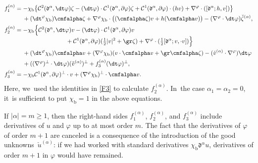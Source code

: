 \begin{align*}
f_1^{(\alpha)}
&= - \chi_\mathrm{b}\bigl\{ {\mathcal C}^2(\mathfrak{d}^\alpha,\dt \varphi)\zeta
- (\dt\varphi)\cdot {\mathcal C}^1(\mathfrak{d}^\alpha,\partial\varphi)\zeta
+ {\mathcal C}^1(\mathfrak{d}^\alpha,\partial\varphi)\cdot(hv)
+ \nabla^\varphi\cdot([\mathfrak{d}^\alpha;h,v]) \bigr\} \\
&\quad\;
+ (\dt^\varphi\chi_\mathrm{b}) \cmfalpha \zeta
+ \nabla^\varphi\chi_\mathrm{b}\cdot\bigl((\cmfalpha \zeta)v + h (\cmfalpha v) \bigr)
- (\nabla^\varphi\cdot\dt\varphi)\check{\zeta}^{(\alpha)}, \\
f_2^{(\alpha)}
&= -\chi_\mathrm{b}\Bigl\{ {\mathcal C}^2(\mathfrak{d}^\alpha,\dt \varphi) v
- (\dt\varphi)\cdot {\mathcal C}^1(\mathfrak{d}^\alpha,\partial\varphi)v\\[-3pt]
&\hspace*{3cm}+ {\mathcal C}^1(\mathfrak{d}^\alpha,\partial\varphi) (\tfrac12|v|^2+\gr\zeta)
+ \nabla^\varphi\cdot(\tfrac12[\mathfrak{d}^\alpha;v,\cdot v]) \Bigr\}\\
&\quad\;+ (\dt^\varphi\chi_\mathrm{b}) \cmfalpha v
+ (\nabla^\varphi\chi_\mathrm{b})(v\cdot\cmfalpha v + \gr\cmfalpha\zeta)- (\check{v}^{(\alpha)}\cdot\nabla^\varphi)\dt\varphi  \\
&\quad\;
+ ((\nabla^\varphi)^\perp\cdot\dt\varphi)(\check{v}^{(\alpha)})^\perp
+ f_3^{(\alpha)}(\dt\varphi)^\perp, \\
f_3^{(\alpha)}
&= -\chi_\mathrm{b} {\mathcal C}^1(\mathfrak{d}^\alpha,\partial\varphi)^\perp \cdot v
+ (\nabla^\varphi\chi_\mathrm{b})^\perp\cdot \cmfalpha v.
\end{align*}
Here, we~used the identities in \eqref{F3} to calculate $f_2^{(\alpha)}$. In~the case $\alpha_1=\alpha_2=0$, it~is sufficient to put $\chi_\mathrm{b}=1$ in the above equations.

\begin{remark}\label{re:GU1}
If $|\alpha|=m\geq1$, then the right-hand sides $f_1^{(\alpha)}$, $f_2^{(\alpha)}$, and $f_3^{(\alpha)}$ include derivatives of $u$ and $\varphi$
up to at most order $m$.
The fact that the derivatives of $\varphi$ of order $m+1$ are canceled is a consequence of the introduction of the good unknowns~$\check{u}^{(\alpha)}$:
if we had worked with standard derivatives $\chi_\mathrm{b}\mathfrak{d}^\alpha u$, derivatives of order $m+1$ in $\varphi$ would have remained.
\end{remark}


